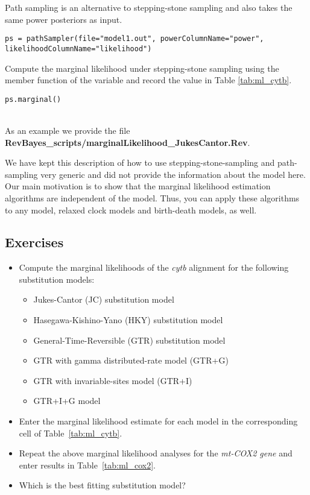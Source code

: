 Path sampling is an alternative to stepping-stone sampling and also takes the same power posteriors as input. 
{\tt \small \begin{snugshade*}
\begin{lstlisting}
ps = pathSampler(file="model1.out", powerColumnName="power", likelihoodColumnName="likelihood")
\end{lstlisting}
\end{snugshade*}}

Compute the marginal likelihood under stepping-stone sampling using the member function  of the  variable and record the value in Table \ref{tab:ml_cytb}.
{\tt \begin{snugshade*}
\begin{lstlisting}
ps.marginal() 
\end{lstlisting}
\end{snugshade*}}

\noindent \\ \impmark As an example we provide the file \textbf{RevBayes\_scripts/marginalLikelihood\_JukesCantor.Rev}.

\begin{framed}
We have kept this description of how to use stepping-stone-sampling and path-sampling very generic and did not provide the information about the model here.
Our main motivation is to show that the marginal likelihood estimation algorithms are independent of the model.
Thus, you can apply these algorithms to any	model, \EG relaxed clock models and birth-death models, as well.
\end{framed}



\subsection{Exercises}

\begin{itemize}
\item Compute the marginal likelihoods of the \textit{cytb} alignment for the following substitution models:
\begin{itemize}
\item Jukes-Cantor (JC) substitution model
\item Hasegawa-Kishino-Yano (HKY) substitution model
\item General-Time-Reversible (GTR) substitution model
\item GTR with gamma distributed-rate model (GTR+G)
\item GTR with invariable-sites model  (GTR+I)
\item GTR+I+G model
\end{itemize}
\item Enter the marginal likelihood estimate for each model in the corresponding cell of Table~\ref{tab:ml_cytb}.
\item Repeat the above marginal likelihood analyses for the \textit{mt-COX2 gene} and enter results in Table~\ref{tab:ml_cox2}.
\item Which is the best fitting substitution model?
\end{itemize}

